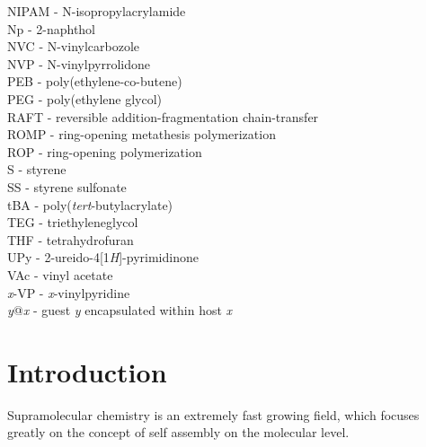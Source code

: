 \documentclass[a4wide,12pt]{report} %
\begin{document}
NIPAM - N-isopropylacrylamide\\
Np - 2-naphthol\\
NVC - N-vinylcarbozole\\
NVP - N-vinylpyrrolidone\\
PEB - poly(ethylene-co-butene)\\
PEG - poly(ethylene glycol)\\
RAFT - reversible addition-fragmentation chain-transfer\\
ROMP - ring-opening metathesis polymerization\\
ROP - ring-opening polymerization\\
S - styrene\\
SS - styrene sulfonate\\
tBA - poly({\it tert}-butylacrylate)\\
TEG - triethyleneglycol\\
THF - tetrahydrofuran\\
UPy - 2-ureido-4[1{\it H}]-pyrimidinone\\
VAc - vinyl acetate\\
{\it x}-VP - {\it x}-vinylpyridine\\
{\it y}@{\it x} - guest {\it y} encapsulated within host {\it x}


\tableofcontents








\chapter{Introduction}



Supramolecular chemistry \cite{Lehn:1995p2342, Cram:1974p2474, PEDERSEN:1988p2572} is an extremely fast growing field, which focuses greatly on the concept of self assembly on the molecular level. 
\end{document}
